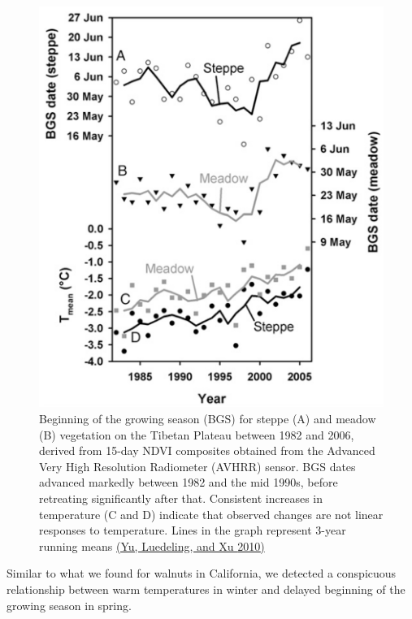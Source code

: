 \documentclass[
]{book}
\begin{document}
\begin{figure}
\centering
\includegraphics{pictures/PLS_Tibet_1.png}
\caption{Beginning of the growing season (BGS) for steppe (A) and meadow (B) vegetation on the Tibetan Plateau between 1982 and 2006, derived from 15-day NDVI composites obtained from the Advanced Very High Resolution Radiometer (AVHRR) sensor. BGS dates advanced markedly between 1982 and the mid 1990s, before retreating significantly after that. Consistent increases in temperature (C and D) indicate that observed changes are not linear responses to temperature. Lines in the graph represent 3-year running means \href{https://www.pnas.org/content/pnas/107/51/22151.full.pdf}{(Yu, Luedeling, and Xu \protect\hyperlink{ref-yu2010winter}{2010})}}
\end{figure}

Similar to what we found for walnuts in California, we detected a conspicuous relationship between warm temperatures in winter and delayed beginning of the growing season in spring.
\end{document}
